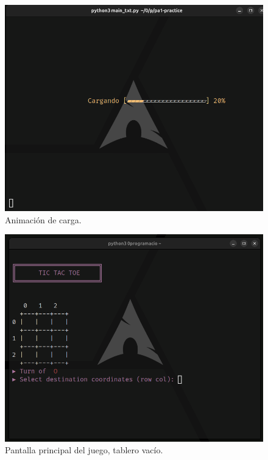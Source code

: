\documentclass[a4paper,12pt]{article}
\begin{document}
\begin{figure}[htbp]
    \centering
    \includegraphics[scale=0.45]{./imagenes/animacion.png}
    \caption{Animación de carga.}\label{fig:animacion}
\end{figure}
\begin{figure}[htbp]
    \centering
    \includegraphics[scale=0.45]{./imagenes/principal_txt.png}
    \caption{Pantalla principal del juego, tablero vacío.}\label{fig:principal_txt}
\end{figure}
\end{document}
